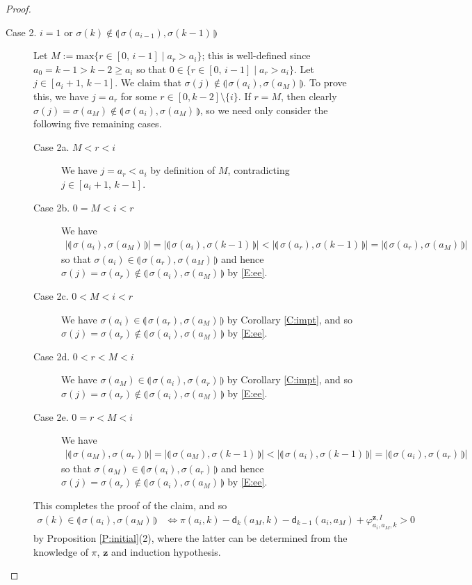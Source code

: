 \documentclass[11pt,a4paper,reqno]{amsart}
\numberwithin{equation}{section}
\theoremstyle{plain}
\theoremstyle{definition}
\theoremstyle{remark}
\numberwithin{equation}{section}
\newcommand{\bz}{\mathbf{z}}
\renewcommand{\max}{\mathrm{max}}
\newcommand{\ff}{\varphi}
\newcommand{\dd}{\mathsf{d}}
\newcommand{\ft}[2]{\llparenthesis\, #1,#2 \,\rrparenthesis}
\begin{document}
\begin{proof}
\begin{description}
\item[Case 2. $i = 1$ or $\sigma(k) \notin \ft{\sigma(a_{i-1})}{\sigma(k-1)}$]
Let $M:= \max \{ r \in [0,\,i-1] \mid a_{r} > a_i \}$; this is well-defined since $a_0 = k-1 > k-2 \geq a_i$ so that $0 \in \{ r \in [0,\,i-1] \mid a_{r} > a_i \}$.
Let $j \in [a_i+1,\, k-1]$.
We claim that $\sigma(j) \notin \ft{\sigma(a_i)}{\sigma(a_M)}$.
To prove this, we have $j = a_r$ for some $r \in [0,k-2] \setminus \{i\}$.
If $r = M$, then clearly $\sigma(j) = \sigma(a_M) \notin \ft{\sigma(a_i)}{\sigma(a_M)}$, so we need only consider the following five remaining cases.
\begin{description}
\item[Case 2a. $M < r < i$]  We have $j = a_r < a_i$ by definition of $M$, contradicting $j \in [a_i+1,\, k-1]$.

\item[Case 2b. $0 = M < i < r$] We have
\begin{align*}
|\ft{\sigma(a_i)}{\sigma(a_M)}| = |\ft{\sigma(a_i)}{\sigma(k-1)}| < |\ft{\sigma(a_r)}{\sigma(k-1)}| = |\ft{\sigma(a_r)}{\sigma(a_M)}|
\end{align*}
so that $\sigma(a_i) \in \ft{\sigma(a_r)}{\sigma(a_M)}$ and hence $\sigma(j) = \sigma(a_r) \notin \ft{\sigma(a_i)}{\sigma(a_M)}$ by \eqref{E:ee}.

\item[Case 2c. $0 < M < i < r$] We have $\sigma(a_i) \in \ft{\sigma(a_r)}{\sigma(a_M)}$ by Corollary \ref{C:impt}, and so $\sigma(j) = \sigma(a_r) \notin \ft{\sigma(a_i)}{\sigma(a_M)}$ by \eqref{E:ee}.

\item[Case 2d. $0 < r < M < i$] We have $\sigma(a_M) \in \ft{\sigma(a_i)}{\sigma(a_r)}$ by Corollary \ref{C:impt}, and so $\sigma(j) = \sigma(a_r) \notin \ft{\sigma(a_i)}{\sigma(a_M)}$ by \eqref{E:ee}.

\item[Case 2e. $0 = r < M < i$] We have
\begin{align*}
|\ft{\sigma(a_M)}{\sigma(a_r)}| = |\ft{\sigma(a_M)}{\sigma(k-1)}| < |\ft{\sigma(a_i)}{\sigma(k-1)}| = |\ft{\sigma(a_i)}{\sigma(a_r)}|
\end{align*}
so that $\sigma(a_M) \in \ft{\sigma(a_i)}{\sigma(a_r)}$ and hence $\sigma(j) = \sigma(a_r) \notin \ft{\sigma(a_i)}{\sigma(a_M)}$ by \eqref{E:ee}.
\end{description}
This completes the proof of the claim, and so
\begin{align}
\sigma(k) \in \ft{\sigma(a_{i})}{\sigma(a_{M})}
&\Leftrightarrow \pi(a_i,k) - \dd_k(a_M,k) - \dd_{k-1}(a_i,a_M) + \ff^{\bz,I}_{a_i,a_M,k} > 0 \label{E:cond}
\end{align}
by Proposition \ref{P:initial}(2), where the latter can be determined from the knowledge of $\pi$, $\bz$ and induction hypothesis.


\end{description}
\end{proof}
\end{document}
